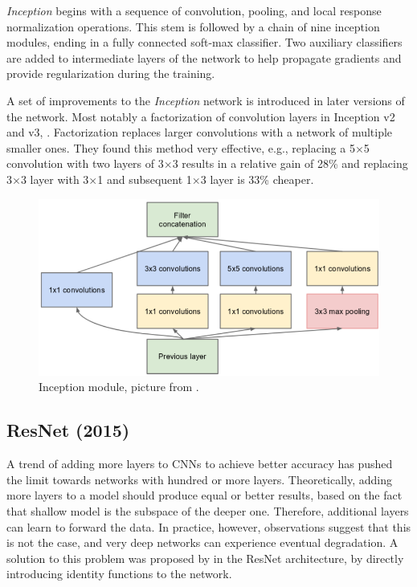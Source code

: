 \textit{Inception} begins with a sequence of convolution, pooling, and local response normalization operations. This stem is followed by a chain of nine inception modules, ending in a fully connected soft-max classifier. Two auxiliary classifiers are added to intermediate layers of the network to help propagate gradients and provide regularization during the training.

A set of improvements to the \textit{Inception} network is introduced in later versions of the network. Most notably a factorization of convolution layers in Inception v2 and v3, \citeauthor{bib:inception2} \cite{bib:inception2}. Factorization replaces larger convolutions with a network of multiple smaller ones. They found this method very effective, e.g., replacing a 5$\times$5 convolution with two layers of 3$\times$3 results in a relative gain of 28\% and replacing 3$\times$3 layer with 3$\times$1 and subsequent 1$\times$3 layer is 33\% cheaper.

\begin{figure}
    \includegraphics[width=\textwidth]{img/inception}
    \caption{Inception module, picture from \cite[figure 2]{bib:googlenet}.}
    \label{fig:incept_mod}
\end{figure}

\subsection{ResNet (2015)}
\label{sec:resnet}
A trend of adding more layers to CNNs to achieve better accuracy has pushed the limit towards networks with hundred or more layers.  Theoretically, adding more layers to a model should produce equal or better results, based on the fact that shallow model is the subspace of the deeper one. Therefore, additional layers can learn to forward the data. In practice, however, observations suggest that this is not the case, and very deep networks can experience eventual degradation. A solution to this problem was proposed by \citeauthor{bib:resnet} \cite{bib:resnet} in the ResNet architecture, by directly introducing identity functions to the network.

